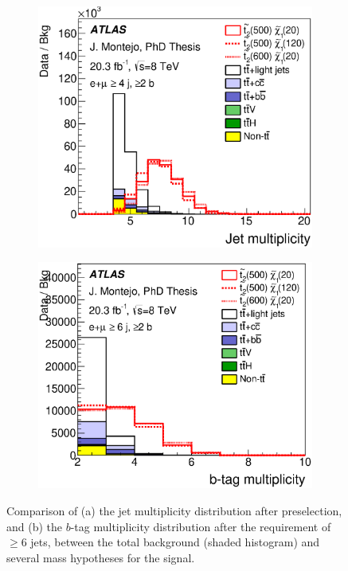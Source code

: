 \begin{figure}[!btp]
\centering
\begin{subfigure}{0.49\textwidth}{\includegraphics[trim=0cm 5cm 0cm 0cm, clip=true, width=\textwidth]{Analysis/Figures_stop2/plots_stop2/ELEMUON/4jetin/2btagin/jet_n_ELEMUON_4jetin2btagin_NOMINAL}}\caption{}\label{fig:shapestop_njet}
    \end{subfigure}
\begin{subfigure}{0.49\textwidth}{\includegraphics[trim=0cm 5cm 0cm 0cm, clip=true, width=\textwidth]{Analysis/Figures_stop2/plots_stop2/ELEMUON/6jetin/2btagin/bjet_n_ELEMUON_6jetin2btagin_NOMINAL}}\caption{}\label{fig:shapestop_nbtag}
    \end{subfigure}
\caption{Comparison of (a) the jet multiplicity distribution after preselection, and (b) the $b$-tag multiplicity distribution 
after the requirement of $\geq$6 jets, between the total background (shaded histogram) and several mass hypotheses for the signal.
}
\label{fig:shapestop_njet_nbtag}
\end{figure}

